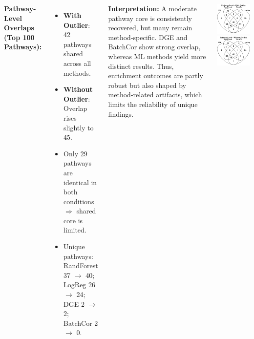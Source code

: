 \begin{columns}
{\vspace{0.75cm}
\begin{minipage}{0.65\textwidth}
\textbf{Pathway-Level Overlaps (Top 100 Pathways):}
\begin{itemize}
\item \textbf{With Outlier}: 42 pathways shared across all methods.
\item \textbf{Without Outlier}: Overlap rises slightly to 45.
\item Only 29 pathways are identical in both conditions $\Rightarrow$ shared core is limited.
\item Unique pathways: RandForest 37 $\rightarrow$ 40; LogReg 26 $\rightarrow$ 24; DGE 2 $\rightarrow$ 2; BatchCor 2 $\rightarrow$ 0.
\end{itemize}
\vspace{0.25em} \textbf{Interpretation:} A moderate pathway core is consistently recovered, but many remain method-specific. DGE and BatchCor show strong overlap, whereas ML methods yield more distinct results. Thus, enrichment outcomes are partly robust but also shaped by method-related artifacts, which limits the reliability of unique findings.
\end{minipage}
\hfill 
\begin{minipage}{20cm}
    \includegraphics[width=9cm]{pathways_with_outlier.png}
	\hfill
	\includegraphics[width=9cm]{pathways_without_outlier.png}   

\end{minipage}}
\end{columns}
